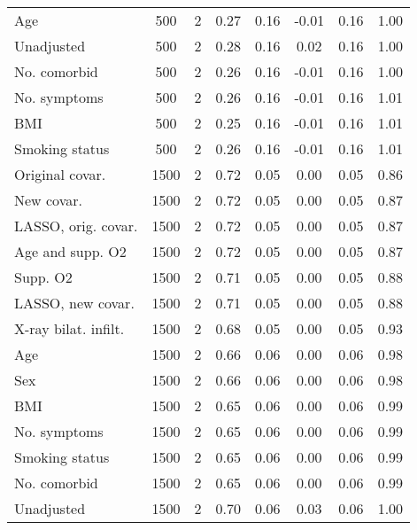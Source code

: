 \documentclass{article}
\begin{document}
\begin{table}[htbp]
{\begin{tabular}{lccccccc}
Age & 500 & 2 & 0.27 & 0.16 & -0.01 & 0.16 & 1.00\\
Unadjusted & 500 & 2 & 0.28 & 0.16 & 0.02 & 0.16 & 1.00\\
No. comorbid & 500 & 2 & 0.26 & 0.16 & -0.01 & 0.16 & 1.00\\
No. symptoms & 500 & 2 & 0.26 & 0.16 & -0.01 & 0.16 & 1.01\\
BMI & 500 & 2 & 0.25 & 0.16 & -0.01 & 0.16 & 1.01\\
Smoking status & 500 & 2 & 0.26 & 0.16 & -0.01 & 0.16 & 1.01\\ \midrule
Original covar. & 1500 & 2 & 0.72 & 0.05 & 0.00 & 0.05 & 0.86\\
New covar. & 1500 & 2 & 0.72 & 0.05 & 0.00 & 0.05 & 0.87\\
LASSO, orig. covar. & 1500 & 2 & 0.72 & 0.05 & 0.00 & 0.05 & 0.87\\
Age and supp. O2 & 1500 & 2 & 0.72 & 0.05 & 0.00 & 0.05 & 0.87\\
Supp. O2 & 1500 & 2 & 0.71 & 0.05 & 0.00 & 0.05 & 0.88\\
LASSO, new covar. & 1500 & 2 & 0.71 & 0.05 & 0.00 & 0.05 & 0.88\\
X-ray bilat. infilt. & 1500 & 2 & 0.68 & 0.05 & 0.00 & 0.05 & 0.93\\
Age & 1500 & 2 & 0.66 & 0.06 & 0.00 & 0.06 & 0.98\\
Sex & 1500 & 2 & 0.66 & 0.06 & 0.00 & 0.06 & 0.98\\
BMI & 1500 & 2 & 0.65 & 0.06 & 0.00 & 0.06 & 0.99\\
No. symptoms & 1500 & 2 & 0.65 & 0.06 & 0.00 & 0.06 & 0.99\\
Smoking status & 1500 & 2 & 0.65 & 0.06 & 0.00 & 0.06 & 0.99\\
No. comorbid & 1500 & 2 & 0.65 & 0.06 & 0.00 & 0.06 & 0.99\\
Unadjusted & 1500 & 2 & 0.70 & 0.06 & 0.03 & 0.06 & 1.00\\
\bottomrule
\hline
\end{tabular}}
\end{table}
\end{document}
